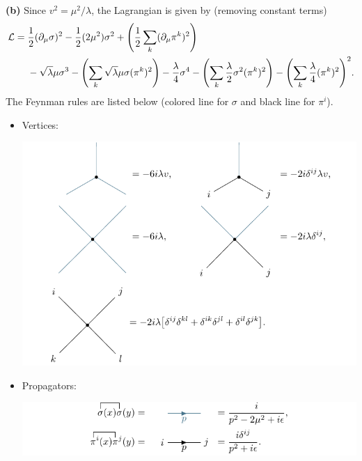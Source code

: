 \documentclass{article}
\makeatletter
\newcommand*{\shifttext}[1]{%
  \settowidth{\@tempdima}{#1}%
  \hspace{-\@tempdima}#1%
}
\newcommand{\plabel}[1]{%
\shifttext{\textbf{#1}\quad}%
}
\makeatother
\begin{document}
\plabel{(b)}%
Since $v^2 = \mu^2 / \lambda$, the Lagrangian is given by (removing constant terms)
\begin{align*}
  \mathcal{L} &= \frac{1}{2}(\partial_\mu \sigma)^2 - \frac{1}{2}(2\mu^2)\sigma^2 + \qty(\frac{1}{2} \sum_k (\partial_\mu \pi^k)^2) \\
  &\phantom{{}={}} - \sqrt{\lambda}\mu\sigma^3 - \qty(\sum_k \sqrt{\lambda}\mu\sigma (\pi^k)^2) - \frac{\lambda}{4}\sigma^4 - \qty(\sum_k \frac{\lambda}{2} \sigma^2 (\pi^k)^2) - \qty(\sum_k \frac{\lambda}{4}(\pi^k)^2)^2.
\end{align*}
The Feynman rules are listed below (colored line for $\sigma$ and black line for $\pi^i$).
\begin{itemize}
  \item Vertices:
  \begin{center}
    \includegraphics{img/vertex/vertex.pdf}
  \end{center}
  \item Propagators:
  \begin{center}
    \includegraphics{img/propagator/propagator.pdf}
  \end{center}
\end{itemize}
\end{document}
